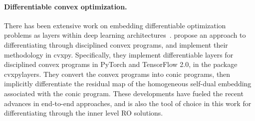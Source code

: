 \documentclass[11pt]{article}
\begin{document}


\paragraph{Differentiable convex optimization.}
There has been extensive work on embedding differentiable optimization problems as layers within deep learning architectures~\citep{amos2021optnet}.
\cite{cvxpylayers2019} propose an approach to differentiating through disciplined convex programs, and implement their methodology in cvxpy. Specifically, they implement differentiable layers for disciplined convex programs in PyTorch and TensorFlow 2.0, in the package cvxpylayers.
They convert the convex programs into conic programs, then implicitly differentiate the residual map of the homogeneous self-dual embedding associated with the conic program.
These developments have fueled the recent advances in end-to-end approaches, and is also the tool of choice in this work for differentiating through the inner level \gls{RO} solutions.
\end{document}
